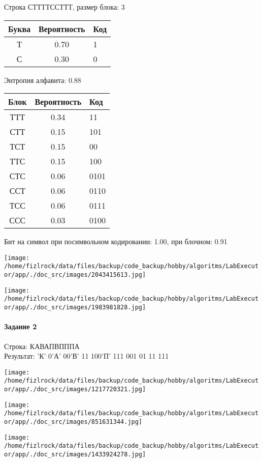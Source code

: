 \documentclass[a4paper, 12pt]{article}
\begin{document}
Строка СТТТТССТТТ, размер блока: 3
\begin{center}
 \begin{tabular}{ |c|c|l| } 
  \hline
     Буква & Вероятность & Код\\ \hline
Т & 0.70 & 1\\\hline
С & 0.30 & 0
\\ \hline \end{tabular}
\end{center}
Энтропия алфавита: 0.88
\begin{center}
 \begin{tabular}{ |c|c|l| } 
  \hline
     Блок & Вероятность & Код\\ \hline
ТТТ & 0.34 & 11\\\hline
СТТ & 0.15 & 101\\\hline
ТСТ & 0.15 & 00\\\hline
ТТС & 0.15 & 100\\\hline
СТС & 0.06 & 0101\\\hline
ССТ & 0.06 & 0110\\\hline
ТСС & 0.06 & 0111\\\hline
ССС & 0.03 & 0100
\\ \hline \end{tabular}
\end{center}
Бит на символ при посимвольном кодировании: 1.00, при блочном: 0.91

\texttt{[image: /home/fizlrock/data/files/backup/code\_backup/hobby/algoritms/LabExecutor/app/./doc\_src/images/2043415613.jpg]}

\texttt{[image: /home/fizlrock/data/files/backup/code\_backup/hobby/algoritms/LabExecutor/app/./doc\_src/images/1983981828.jpg]}
\pagebreak
\paragraph{Задание 2}

Строка: 
КАВАПВПППА\\
Результат: 'К' 0'А' 00'В' 11 100'П' 111 001 01 11 111

\texttt{[image: /home/fizlrock/data/files/backup/code\_backup/hobby/algoritms/LabExecutor/app/./doc\_src/images/1217720321.jpg]}

\texttt{[image: /home/fizlrock/data/files/backup/code\_backup/hobby/algoritms/LabExecutor/app/./doc\_src/images/851631344.jpg]}

\texttt{[image: /home/fizlrock/data/files/backup/code\_backup/hobby/algoritms/LabExecutor/app/./doc\_src/images/1433924278.jpg]}
\end{document}
